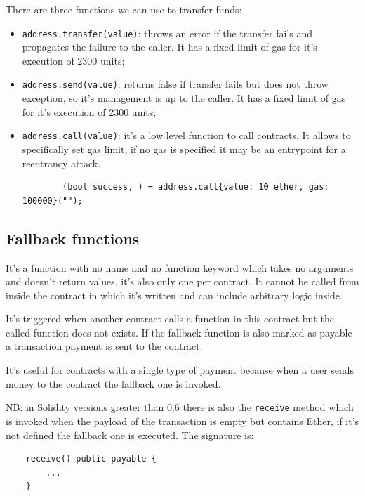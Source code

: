 There are three functions we can use to transfer funds:
\begin{itemize}
    \item \verb|address.transfer(value)|: throws an error if the transfer fails and propagates the failure to the caller.
    It has a fixed limit of gas for it's execution of 2300 units;

    \item \verb|address.send(value)|: returns false if transfer fails but does not throw exception, so it's management is up to the caller.
    It has a fixed limit of gas for it's execution of 2300 units;

    \item \verb|address.call(value)|: it's a low level function to call contracts.
    It allows to specifically set gas limit, if no gas is specified it may be an entrypoint for a reentrancy attack.
    \begin{verbatim}
        (bool success, ) = address.call{value: 10 ether, gas: 100000}("");
    \end{verbatim}
\end{itemize}

\subsection{Fallback functions}
It's a function with no name and no function keyword which takes no arguments and doesn't return values, it's also only one per contract.
It cannot be called from inside the contract in which it's written and can include arbitrary logic inside.

It's triggered when another contract calls a function in this contract but the called function does not exists.
If the fallback function is also marked as payable a transaction payment is sent to the contract.

It's useful for contracts with a single type of payment because when a user sends money to the contract the fallback one is invoked.

NB: in Solidity versions greater than 0.6 there is also the \verb|receive| method which is invoked when the payload of the transaction is empty but contains Ether, if it's not defined the fallback one is executed.
The signature is:
\begin{verbatim}
    receive() public payable {
        ...
    }
\end{verbatim}

